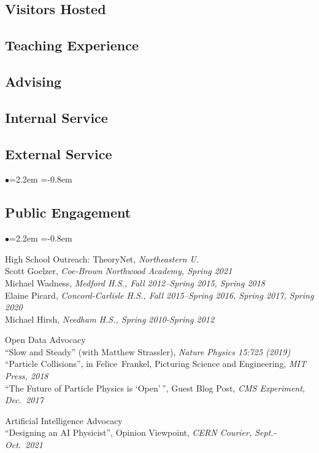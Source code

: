\documentclass[11pt]{article}
\newcommand{\heading}[1]{\vspace{0in}\subsection*{#1} \vspace{.02in}}
\newcommand{\bbl}{\begin{list}{$\bullet$}{\leftmargin=2.2em \itemsep=-1pt \itemindent=-0.8em}}
\newcommand{\el}{\end{list}}
\begin{document}



\heading{Visitors Hosted}




\heading{Teaching Experience}




\heading{Advising}




\heading{Internal Service}




\heading{External Service}

\bbl


\el


\heading{Public Engagement}

\bbl
\item High School Outreach:  TheoryNet, \textit{Northeastern U.}
\\ Scott Goelzer, \textit{Coe-Brown Northwood Academy, Spring 2021}
\\ Michael Wadness, \textit{Medford H.S., Fall 2012--Spring 2015, Spring 2018}
\\ Elaine Picard, \textit{Concord-Carlisle H.S., Fall 2015--Spring 2016, Spring 2017, Spring 2020}
\\ Michael Hirsh, \textit{Needham H.S., Spring 2010-Spring 2012}
\item Open Data Advocacy
\\ ``Slow and Steady'' (with Matthew Strassler), \textit{Nature Physics 15:725 (2019)}
\\ ``Particle Collisions'', in Felice~Frankel, Picturing Science and Engineering, \textit{MIT Press, 2018}
\\ ``The Future of Particle Physics is `Open'\,'', Guest Blog Post, \textit{CMS Experiment, Dec.~2017}
\item Artificial Intelligence Advocacy
\\ ``Designing an AI Physicist'', Opinion Viewpoint, \textit{CERN Courier, Sept.-Oct.~2021}
\el
\end{document}
